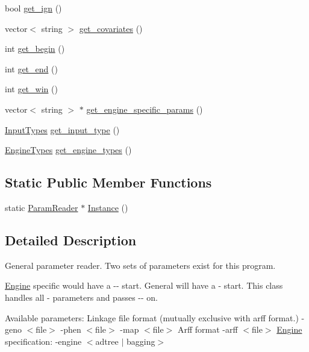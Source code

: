 \begin{DoxyCompactItemize}
\item 
bool \hyperlink{classParamReader_a288cde2c7b78f3ffeb28e9d56a595826}{get\_\-ign} ()
\item 
vector$<$ string $>$ \hyperlink{classParamReader_a24781bbe8138d3c4eedb072ce88f5b95}{get\_\-covariates} ()
\item 
int \hyperlink{classParamReader_acbc52d902d67738b096a0b41bcf7d61d}{get\_\-begin} ()
\item 
int \hyperlink{classParamReader_a7f97caf26c9a65a6634b66f27d48f258}{get\_\-end} ()
\item 
int \hyperlink{classParamReader_a49f7db5405ebe1a3c61dadcfac296d49}{get\_\-win} ()
\item 
vector$<$ string $>$ $\ast$ \hyperlink{classParamReader_aa92383f88df295288d31a154c35a43ab}{get\_\-engine\_\-specific\_\-params} ()
\item 
\hyperlink{classParamReader_a5954b9845fceb081c5e259dfc7118238}{InputTypes} \hyperlink{classParamReader_ad2e79ce88de8894f58b38f6ff6452b02}{get\_\-input\_\-type} ()
\item 
\hyperlink{classParamReader_ade771142042ad0251f905f38248ae9df}{EngineTypes} \hyperlink{classParamReader_a2a0885d0793cc84eeaf641f5b36d6fae}{get\_\-engine\_\-types} ()
\end{DoxyCompactItemize}
\subsection*{Static Public Member Functions}
\begin{DoxyCompactItemize}
\item 
static \hyperlink{classParamReader}{ParamReader} $\ast$ \hyperlink{classParamReader_a418f7d1f1bf0ad4cb3a6e7aaccc9ead3}{Instance} ()
\end{DoxyCompactItemize}


\subsection{Detailed Description}
General parameter reader. Two sets of parameters exist for this program.

\hyperlink{classEngine}{Engine} specific would have a -\/-\/ start. General will have a -\/ start. This class handles all -\/ parameters and passes -\/-\/ on.

Available parameters: Linkage file format (mutually exclusive with arff format.) -\/geno $<$file$>$ -\/phen $<$file$>$ -\/map $<$file$>$ Arff format -\/arff $<$file$>$ \hyperlink{classEngine}{Engine} specification: -\/engine $<$adtree $|$ bagging$>$


